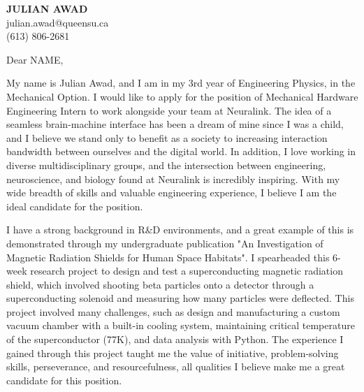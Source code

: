 \documentclass[11pt]{letter} %
\begin{document}


\begin{center}
\textbf{\huge JULIAN AWAD} \\ %
\vspace{0.5em}
julian.awad@queensu.ca \\ (613) 806-2681 %
\end{center}
\vspace{2.5em}
\hspace{2em}

\signature{Julian Awad} %
\vspace{-1in}
\opening{Dear NAME,}

My name is Julian Awad, and I am in my 3rd year of Engineering Physics, in the Mechanical Option. I would like to apply for the position of Mechanical Hardware Engineering Intern to work alongside your team at Neuralink. The idea of a seamless brain-machine interface has been a dream of mine since I was a child, and I believe we stand only to benefit as a society to increasing interaction bandwidth between ourselves and the digital world. In addition, I love working in diverse multidisciplinary groups, and the intersection between engineering, neuroscience, and biology found at Neuralink is incredibly inspiring. With my wide breadth of skills and valuable engineering experience, I believe I am the ideal candidate for the position.

I have a strong background in R&D environments, and a great example of this is demonstrated through my undergraduate publication "An Investigation of Magnetic Radiation Shields for Human Space Habitats". I spearheaded this 6-week research project to design and test a superconducting magnetic radiation shield, which involved shooting beta particles onto a detector through a superconducting solenoid and measuring how many particles were deflected. This project involved many challenges, such as design and manufacturing a custom vacuum chamber with a built-in cooling system, maintaining critical temperature of the superconductor (77K), and data analysis with Python. The experience I gained through this project taught me the value of initiative, problem-solving skills, perseverance, and resourcefulness, all qualities I believe make me a great candidate for this position.
\end{document}
